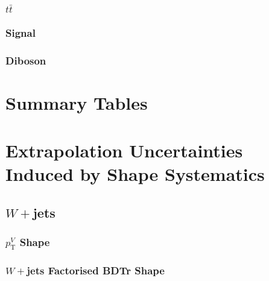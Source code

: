 \subsubsection{\texorpdfstring{$t\bar{t}$}{tt}}

\clearpage
\newpage
\subsubsection{Signal}

\clearpage
\newpage
\subsubsection{Diboson}


\section{Summary Tables}



\section{Extrapolation Uncertainties Induced by Shape Systematics}
\subsection{$W+$jets}
\subsubsection{$p_{\mathrm{T}}^V$ Shape}

\clearpage
\newpage
\subsubsection{$W+$jets Factorised BDTr Shape}

